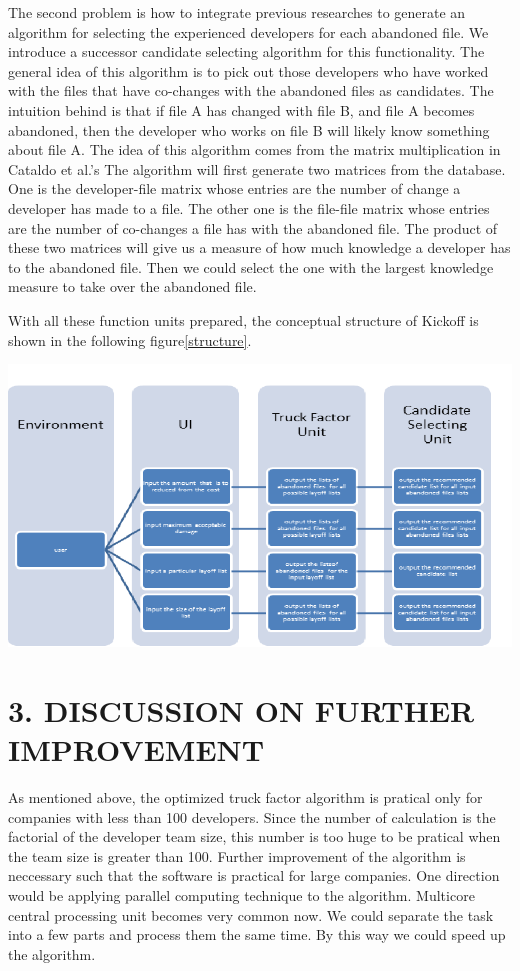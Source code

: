 \documentclass[12pt, a4paper, openright]{report}
\begin{document}
The second problem is how to integrate previous researches to generate an algorithm for selecting the experienced developers for each abandoned file. We introduce a successor candidate selecting algorithm for this functionality. The general idea of this algorithm is to pick out those developers who have worked with the files that have co-changes with the abandoned files as candidates. The intuition behind is that if file A has changed with file B, and file A becomes abandoned, then the developer who works on file B will likely know something about file A. The idea of this algorithm comes from the matrix multiplication in Cataldo et al.'s\cite{Cataldo2006CSCW}
The algorithm will first generate two matrices from the database. One is the developer-file matrix whose entries are the number of change a developer has made to a file. The other one is the file-file matrix whose entries are the number of co-changes a file has with the abandoned file. The product of these two matrices will give us a measure of how much knowledge a developer has to the abandoned file. Then we could select the one with the largest knowledge measure to take over the abandoned file.

With all these function units prepared, the conceptual structure of Kickoff is shown in the following figure\ref{structure}.
\begin{center}
	\includegraphics[scale=0.8]{structure}
	\label{structure}
\end{center}

\newpage
\section*{3. DISCUSSION ON FURTHER IMPROVEMENT}
As mentioned above, the optimized truck factor algorithm is pratical only for companies with less than 100 developers. Since the number of calculation is the factorial of the developer team size, this number is too huge to be pratical when the team size is greater than 100. Further improvement of the algorithm is neccessary such that the software is practical for large companies. One direction would be applying parallel computing technique to the algorithm. Multicore central processing unit becomes very common now. We could separate the task into a few parts and process them the same time. By this way we could speed up the algorithm.
\end{document}
